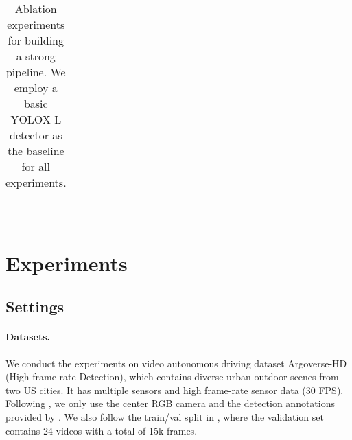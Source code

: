 \documentclass[10pt,twocolumn,letterpaper]{article}
\begin{document}
\begin{table*}[t]
{{\begin{tabular}{@{}c|c|cc|c@{}}
\end{tabular}
} }
\centering
\hspace{1em}
\\
\centering


\caption{Ablation experiments for building a strong pipeline. We employ a basic YOLOX-L detector as the baseline for all experiments.}
\label{tab:ablations}
\end{table*}


\section{Experiments}
\label{sec:exp}



\subsection{Settings}

\paragraph{Datasets.} We conduct the experiments on video autonomous driving dataset Argoverse-HD \cite{argoverse,streamer} (High-frame-rate Detection),  which contains diverse urban outdoor scenes from two US cities. It has multiple sensors and high frame-rate sensor data (30 FPS).
Following \cite{streamer}, we only use the center RGB camera and the detection annotations provided by \cite{streamer}. We also follow the train/val split in \cite{streamer}, where the validation set contains 24 videos with a total of 15k frames.
\end{document}
